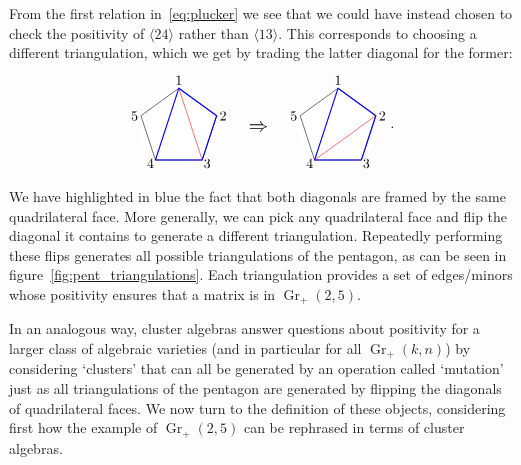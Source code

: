 \documentclass[12pt]{article}
\DeclareMathOperator{\Gr}{Gr}
\def\ket#1{\langle #1 \rangle}
\def\drawLabeledPentagon{
\coordinate (P1) at (90:1);
\coordinate (P2) at (18:1);
\coordinate (P3) at (306:1);
\coordinate (P4) at (234:1);
\coordinate (P5) at (162:1);
\draw[white,fill=white] (0,0) circle (1cm);
\draw (P1) -- (P2) -- (P3) -- (P4) -- (P5) -- cycle;
\draw (0,1.2) node {1};
\draw (.9,.3) node[anchor=west] {2};
\draw (.5,-.9) node[anchor=west] {3};
\draw (-.5,-.9) node[anchor=east] {4};
\draw (-.9,.3) node[anchor=east] {5};
}
\begin{document}
From the first relation in~\eqref{eq:plucker} we see that we could have instead chosen to check the positivity of $\ket{24}$ rather than $\ket{13}$. This corresponds to choosing a different triangulation, which we get by trading the latter diagonal for the former:
\begin{equation}
\begin{gathered}
\begin{tikzpicture}
  \drawLabeledPentagon
  \draw[color=blue, thick] (P1) -- (P2) -- (P3) -- (P4) -- cycle;
  \draw[color=red] (P1) -- (P3);
  \draw (2,0) node {\scalebox{1.4}{$\Rightarrow$}};
\begin{scope}[xshift = 4cm]
  \drawLabeledPentagon
  \draw[color=blue, thick] (P1) -- (P2) -- (P3) -- (P4) -- cycle;
  \draw[color=red] (P2) -- (P4); 
\end{scope}
\end{tikzpicture}
\end{gathered}.  
\end{equation}
We have highlighted in blue the fact that both diagonals are framed by the same quadrilateral face. More generally, we can pick any quadrilateral face and flip the diagonal it contains to generate a different triangulation. Repeatedly performing these flips generates all possible triangulations of the pentagon, as can be seen in figure~\ref{fig:pent_triangulations}. Each triangulation provides a set of edges/minors whose positivity ensures that a matrix is in $\Gr_+(2,5)$. 

In an analogous way, cluster algebras answer questions about positivity for a larger class of algebraic varieties (and in particular for all $\Gr_+(k,n)$) by considering `clusters' that can all be generated by an operation called `mutation' just as all triangulations of the pentagon are generated by flipping the diagonals of quadrilateral faces. We now turn to the definition of these objects, considering first how the example of $\Gr_+(2,5)$ can be rephrased in terms of cluster algebras.
\end{document}
